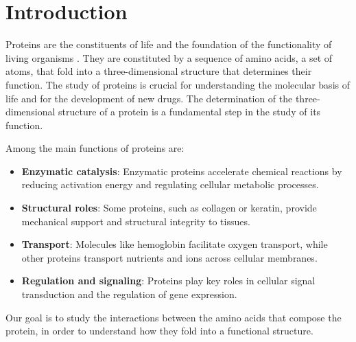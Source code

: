 \documentclass[English, Lau, oneside]{sapthesis}
\title{}
\author{}
\begin{document}
\maketitle
\tableofcontents{}
\tableofcontents



    

\dedication{}

\newpage
\null
\thispagestyle{empty}
\newpage




\newpage
\null
\thispagestyle{empty}
\newpage



\chapter*{Introduction}
\noindent
Proteins are the constituents of life and the foundation of the functionality of living organisms . \cite{ref}
They are constituted by a sequence of amino acids, a set of atoms, that fold into a three-dimensional structure that determines their function. 
The study of proteins is crucial for understanding the molecular basis of life and for the development of new drugs.
The determination of the three-dimensional structure of a protein is a fundamental step in the study of its function.

Among the main functions of proteins are:
\begin{itemize}
    \item \textbf{Enzymatic catalysis}: Enzymatic proteins accelerate chemical reactions by reducing activation energy and regulating cellular metabolic processes.
    \item \textbf{Structural roles}: Some proteins, such as collagen or keratin, provide mechanical support and structural integrity to tissues.
    \item \textbf{Transport}: Molecules like hemoglobin facilitate oxygen transport, while other proteins transport nutrients and ions across cellular membranes.
    \item \textbf{Regulation and signaling}: Proteins play key roles in cellular signal transduction and the regulation of gene expression.
\end{itemize}
Our goal is to study the interactions between the amino acids that compose the protein, 
in order to understand how they fold into a functional structure.
\end{document}
